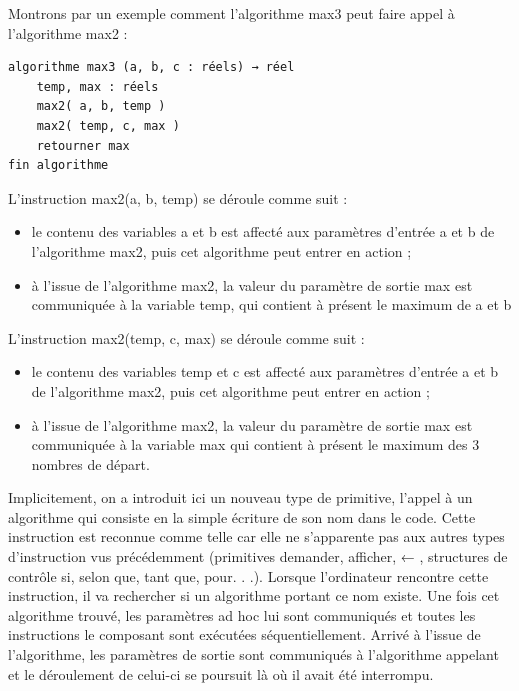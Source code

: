 \documentclass[11pt,a4paper]{article}
\begin{document}
            \par
        Montrons par un exemple comment l'algorithme max3 peut faire appel \`a l'algorithme max2 : 
            \par
        \begin{verbatim}
algorithme max3 (a, b, c : réels) → réel
    temp, max : réels
    max2( a, b, temp )
    max2( temp, c, max )
    retourner max
fin algorithme
      \end{verbatim}
        L'instruction max2(a, b, temp) se d\'eroule comme suit :
        
					\begin{itemize}
				
			\item le contenu des variables a et b est affect\'e aux param\`etres d'entr\'ee a et b de l'algorithme max2, puis cet algorithme peut entrer en action ;
			\item \`a l'issue de l'algorithme max2, la valeur du param\`etre de sortie max est communiqu\'ee \`a la variable temp, qui contient \`a pr\'esent le maximum de a et b
					\end{itemize}
				
            \par
        
        L'instruction max2(temp, c, max) se d\'eroule comme suit :
        
					\begin{itemize}
				
			\item le contenu des variables temp et c est affect\'e aux param\`etres d'entr\'ee a et b de l'algorithme max2, puis cet algorithme peut entrer en action ;
			\item \`a l'issue de l'algorithme max2, la valeur du param\`etre de sortie max est communiqu\'ee \`a la variable max qui contient \`a pr\'esent le maximum des 3 nombres de d\'epart.
					\end{itemize}
				
            \par
        
        Implicitement, on a introduit ici un nouveau type de primitive, l'appel \`a un algorithme qui
        consiste en la simple \'ecriture de son nom dans le code. Cette instruction est reconnue comme
        telle car elle ne s'apparente pas aux autres types d'instruction vus pr\'ec\'edemment (primitives
        demander, afficher, ← , structures de contr\^ole si, selon que, tant que, pour. . .). Lorsque l'ordinateur
        rencontre cette instruction, il va rechercher si un algorithme portant ce nom existe. Une
        fois cet algorithme trouv\'e, les param\`etres ad hoc lui sont communiqu\'es et toutes les instructions
        le composant sont ex\'ecut\'ees s\'equentiellement. Arriv\'e \`a l'issue de l'algorithme, les param\`etres de
        sortie sont communiqu\'es \`a l'algorithme appelant et le d\'eroulement de celui-ci se poursuit l\`a o\`u
        il avait \'et\'e interrompu.
      
\end{document}

